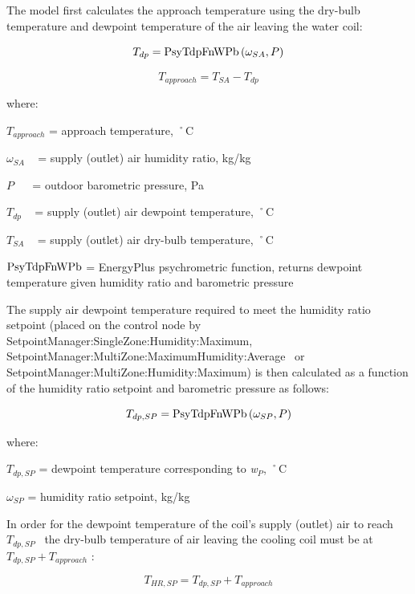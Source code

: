 The model first calculates the approach temperature using the dry-bulb temperature and dewpoint temperature of the air leaving the water coil:

\begin{equation}
{T_{dp}} = {\rm{PsyTdpFnWPb}}\left( {{\omega_{SA}},P} \right)
\end{equation}

\begin{equation}
{T_{approach}} = {T_{SA}} - {T_{dp}}
\end{equation}

where:

\({T_{approach}}\) = approach temperature, ˚C

\({\omega_{SA}}\) ~ = supply (outlet) air humidity ratio, kg/kg

\(P\) ~~ = outdoor barometric pressure, Pa

\({T_{dp}}\) ~ = supply (outlet) air dewpoint temperature, ˚C

\({T_{SA}}\) ~ = supply (outlet) air dry-bulb temperature, ˚C

\({\rm{PsyTdpFnWPb}}\) = EnergyPlus psychrometric function, returns dewpoint temperature given humidity ratio and barometric pressure

The supply air dewpoint temperature required to meet the humidity ratio setpoint (placed on the control node by SetpointManager:SingleZone:Humidity:Maximum, SetpointManager:MultiZone:MaximumHumidity:Average~ or SetpointManager:MultiZone:Humidity:Maximum) is then calculated as a function of the humidity ratio setpoint and barometric pressure as follows:

\begin{equation}
{T_{dp,SP}} = {\rm{PsyTdpFnWPb}}\left( {{\omega_{SP}},P} \right)
\end{equation}

where:

\({T_{dp,SP}}\) = dewpoint temperature corresponding to \emph{w\(_{P}\)}, ˚C

\({\omega_{SP}}\) = humidity ratio setpoint, kg/kg

In order for the dewpoint temperature of the coil's supply (outlet) air to reach \({T_{dp,SP}}\) ~the dry-bulb temperature of air leaving the cooling coil must be at \({T_{dp,SP}} + {T_{approach}}\) :

\begin{equation}
{T_{HR,SP}} = {T_{dp,SP}} + {T_{approach}}
\end{equation}

